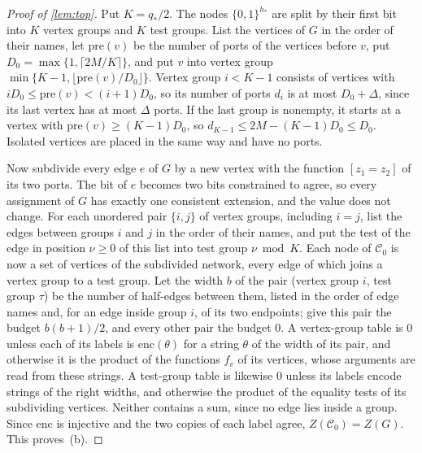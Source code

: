 \documentclass[11pt]{article}
\theoremstyle{definition}
\theoremstyle{definition}
\theoremstyle{remark}
\begin{document}
\begin{proof}[Proof of \cref{lem:top}]
Put $K=q_*/2$. The nodes $\{0,1\}^{h_*}$ are split by their first bit into $K$ vertex groups and $K$ test groups. List the vertices of $G$ in the order of their names, let $\mathrm{pre}(v)$ be the number of ports of the vertices before $v$, put $D_0=\max\{1,\lceil2M/K\rceil\}$, and put $v$ into vertex group $\min\{K-1,\lfloor \mathrm{pre}(v)/D_0\rfloor\}$. Vertex group $i<K-1$ consists of vertices with $iD_0\le \mathrm{pre}(v)<(i+1)D_0$, so its number of ports $d_i$ is at most $D_0+\Delta$, since its last vertex has at most $\Delta$ ports. If the last group is nonempty, it starts at a vertex with $\mathrm{pre}(v)\ge(K-1)D_0$, so $d_{K-1}\le2M-(K-1)D_0\le D_0$. Isolated vertices are placed in the same way and have no ports.

Now subdivide every edge $e$ of $G$ by a new vertex with the function $[z_1=z_2]$ of its two ports. The bit of $e$ becomes two bits constrained to agree, so every assignment of $G$ has exactly one consistent extension, and the value does not change. For each unordered pair $\{i,j\}$ of vertex groups, including $i=j$, list the edges between groups $i$ and $j$ in the order of their names, and put the test of the edge in position $\nu\ge0$ of this list into test group $\nu\bmod K$. Each node of $\mathcal C_0$ is now a set of vertices of the subdivided network, every edge of which joins a vertex group to a test group. Let the width $b$ of the pair (vertex group $i$, test group $\tau$) be the number of half-edges between them, listed in the order of edge names and, for an edge inside group $i$, of its two endpoints; give this pair the budget $b(b+1)/2$, and every other pair the budget $0$. A vertex-group table is $0$ unless each of its labels is $\mathrm{enc}(\theta)$ for a string $\theta$ of the width of its pair, and otherwise it is the product of the functions $f_v$ of its vertices, whose arguments are read from these strings. A test-group table is likewise $0$ unless its labels encode strings of the right widths, and otherwise the product of the equality tests of its subdividing vertices. Neither contains a sum, since no edge lies inside a group. Since $\mathrm{enc}$ is injective and the two copies of each label agree, $Z(\mathcal C_0)=Z(G)$. This proves~(b).


\end{proof}
\end{document}
